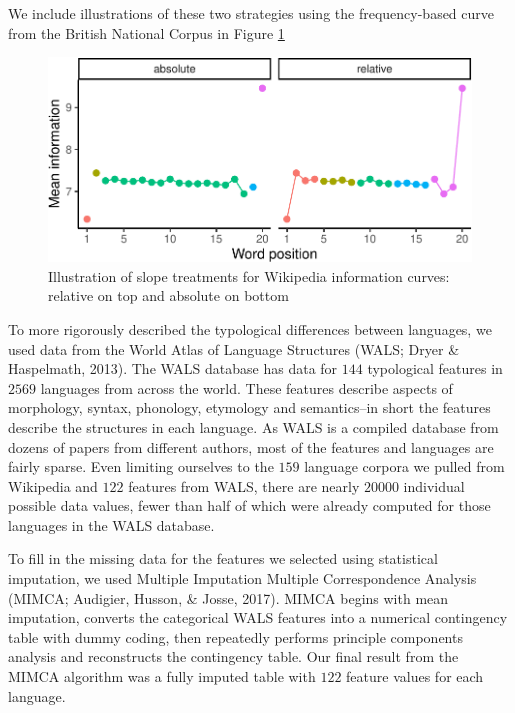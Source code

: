 \documentclass[man,floatsintext]{apa6}
\begin{document}
We include illustrations of these two strategies using the frequency-based curve from the British National Corpus in Figure \ref{fig:treatments}

\begin{figure}
\centering
\includegraphics{figs/treatments-1.pdf}
\caption{\label{fig:treatments}Illustration of slope treatments for Wikipedia information curves: relative on top and absolute on bottom}
\end{figure}

To more rigorously described the typological differences between languages, we used data from the World Atlas of Language Structures (WALS; Dryer \& Haspelmath, 2013). The WALS database has data for \(144\) typological features in \(2569\) languages from across the world. These features describe aspects of morphology, syntax, phonology, etymology and semantics--in short the features describe the structures in each language. As WALS is a compiled database from dozens of papers from different authors, most of the features and languages are fairly sparse. Even limiting ourselves to the \(159\) language corpora we pulled from Wikipedia and \(122\) features from WALS, there are nearly \(20000\) individual possible data values, fewer than half of which were already computed for those languages in the WALS database.

To fill in the missing data for the features we selected using statistical imputation, we used Multiple Imputation Multiple Correspondence Analysis (MIMCA; Audigier, Husson, \& Josse, 2017). MIMCA begins with mean imputation, converts the categorical WALS features into a numerical contingency table with dummy coding, then repeatedly performs principle components analysis and reconstructs the contingency table. Our final result from the MIMCA algorithm was a fully imputed table with \(122\) feature values for each language.
\end{document}

